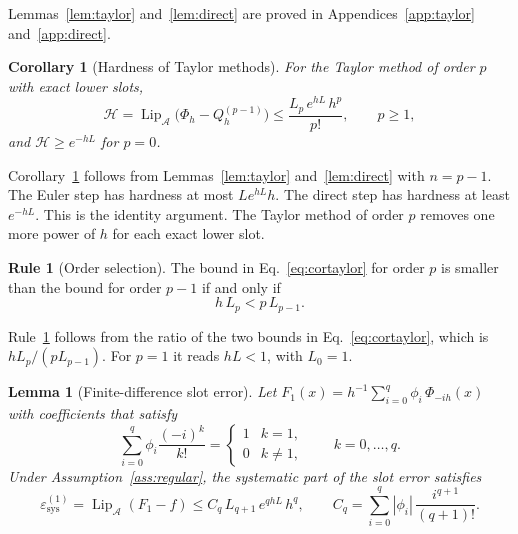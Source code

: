 \documentclass[11pt]{article}
\newtheorem{lemma}{Lemma}
\newtheorem{corollary}{Corollary}
\theoremstyle{definition}
\newtheorem{designrule}{Rule}
\theoremstyle{remark}
\newcommand{\Aset}{\mathcal{A}}          %
\newcommand{\Hard}{\mathcal{H}}          %
\newcommand{\Lip}{\operatorname{Lip}_{\Aset}}
\newcommand{\sys}{\mathrm{sys}}
\begin{document}
Lemmas~\ref{lem:taylor} and~\ref{lem:direct} are proved in Appendices~\ref{app:taylor} and~\ref{app:direct}.

\begin{corollary}[Hardness of Taylor methods]\label{cor:taylor}
For the Taylor method of order $p$ with exact lower slots,
\begin{equation}\label{eq:cortaylor}
\Hard = \Lip\big(\Phi_h - Q^{(p-1)}_h\big) \le \frac{L_p\, e^{hL}\, h^p}{p!}, \qquad p \ge 1,
\end{equation}
and $\Hard \ge e^{-hL}$ for $p = 0$.
\end{corollary}

Corollary~\ref{cor:taylor} follows from Lemmas~\ref{lem:taylor} and~\ref{lem:direct} with $n = p-1$.
The Euler step has hardness at most $L e^{hL} h$.
The direct step has hardness at least $e^{-hL}$.
This is the identity argument.
The Taylor method of order $p$ removes one more power of $h$ for each exact lower slot.

\begin{designrule}[Order selection]\label{rule:order}
The bound in Eq.~\eqref{eq:cortaylor} for order $p$ is smaller than the bound for order $p-1$ if and only if
\begin{equation}\label{eq:rule1}
h\, L_p < p\, L_{p-1}.
\end{equation}
\end{designrule}

Rule~\ref{rule:order} follows from the ratio of the two bounds in Eq.~\eqref{eq:cortaylor}, which is $h L_p / (p L_{p-1})$.
For $p = 1$ it reads $h L < 1$, with $L_0 = 1$.

\begin{lemma}[Finite-difference slot error]\label{lem:fd}
Let $F_1(x) = h^{-1}\sum_{i=0}^{q} \phi_i\, \Phi_{-ih}(x)$ with coefficients that satisfy
\begin{equation}\label{eq:fdorder}
\sum_{i=0}^{q} \phi_i \frac{(-i)^k}{k!} = \begin{cases} 1 & k = 1,\\ 0 & k \ne 1,\end{cases} \qquad k = 0,\dots,q.
\end{equation}
Under Assumption~\ref{ass:regular}, the systematic part of the slot error satisfies
\begin{equation}\label{eq:fd}
\varepsilon^{(1)}_\sys = \Lip(F_1 - f) \le C_q\, L_{q+1}\, e^{qhL}\, h^{q}, \qquad C_q = \sum_{i=0}^{q} |\phi_i|\,\frac{i^{q+1}}{(q+1)!}.
\end{equation}
\end{lemma}
\end{document}
